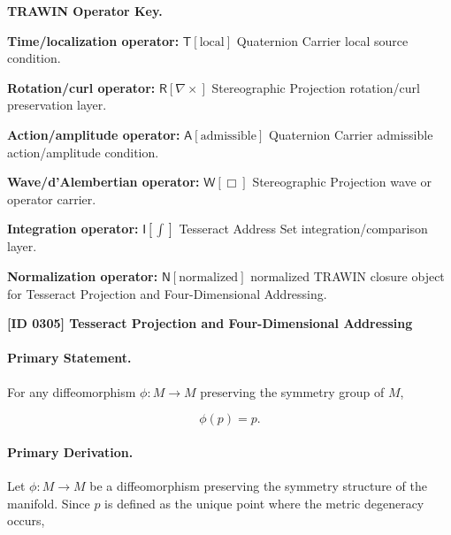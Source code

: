 \par\vspace{0.45\baselineskip}
\noindent\begin{minipage}[t]{\linewidth}
\begingroup
\small
\raggedright
\textbf{TRAWIN Operator Key.}\par
\noindent\textbf{Time/localization operator:} $\mathsf{T}\!\left[\mathrm{local}\right]$ Quaternion Carrier local source condition.\par
\noindent\textbf{Rotation/curl operator:} $\mathsf{R}\!\left[\nabla\times\right]$ Stereographic Projection rotation/curl preservation layer.\par
\noindent\textbf{Action/amplitude operator:} $\mathsf{A}\!\left[\mathrm{admissible}\right]$ Quaternion Carrier admissible action/amplitude condition.\par
\noindent\textbf{Wave/d'Alembertian operator:} $\mathsf{W}\!\left[\Box\right]$ Stereographic Projection wave or operator carrier.\par
\noindent\textbf{Integration operator:} $\mathsf{I}\!\left[\int\right]$ Tesseract Address Set integration/comparison layer.\par
\noindent\textbf{Normalization operator:} $\mathsf{N}\!\left[\mathrm{normalized}\right]$ normalized TRAWIN closure object for Tesseract Projection and Four-Dimensional Addressing.\par
\endgroup
\end{minipage}

\clearpage
\noindent\textbf{[ID 0305] Tesseract Projection and Four-Dimensional Addressing}\par
\vspace{0.35em}
\paragraph{Primary Statement.}
For any diffeomorphism $\phi:M\to M$ preserving the symmetry group of $M$,

\begin{equation}
\phi(p)=p .
\end{equation}

\paragraph{Primary Derivation.}
Let $\phi:M\to M$ be a diffeomorphism preserving the symmetry structure of the manifold. Since $p$ is defined as the unique point where the metric degeneracy occurs,

